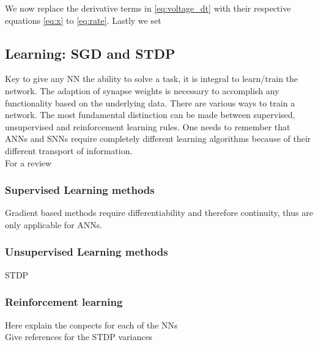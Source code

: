 We now replace the derivative terms in \cref{eq:voltage_dt} with their respective equations \cref{eq:x} to \cref{eq:rate}. Lastly we set





\subsection{Learning: SGD and STDP}
Key to give any \ac{NN} the ability to solve a task, it is integral to learn/train the network. The adaption of synapse weights is necessary to accomplish any functionality based on the underlying data\cite{zheng_introductory_2022}. There are various ways to train a network. The most fundamental distinction can be made between supervised, unsupervised and reinforcement learning rules.
One needs to remember that \acp{ANN} and \acp{SNN} require completely different learning algorithms because of their different transport of information.\\
For a review

\subsubsection{Supervised Learning methods}
Gradient based methods require differentiability and therefore continuity, thus are only applicable for \acp{ANN}.\\

\subsubsection{Unsupervised Learning methods}
STDP
\subsubsection{Reinforcement learning}



Here explain the conpects for each of the NNs\\
Give references for the STDP variances\\
